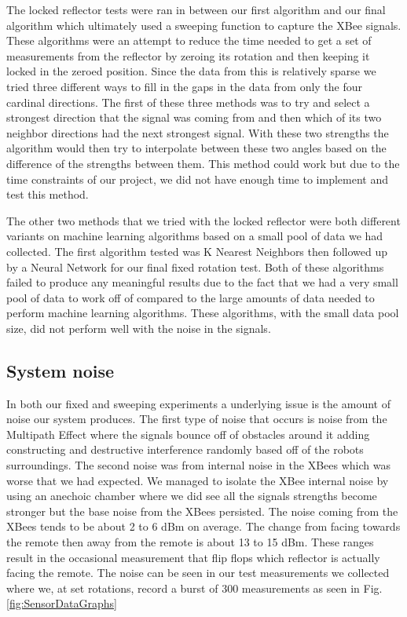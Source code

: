 The locked reflector tests were ran in between our first algorithm and our final algorithm which ultimately used a sweeping function to capture the XBee signals. These algorithms were an attempt to reduce the time needed to get a set of measurements from the reflector by zeroing its rotation and then keeping it locked in the zeroed position. Since the data from this is relatively sparse we tried three different ways to fill in the gaps in the data from only the four cardinal directions. The first of these three methods was to try and select a strongest direction that the signal was coming from and then which of its two neighbor directions had the next strongest signal. With these two strengths the algorithm would then try to interpolate between these two angles based on the difference of the strengths between them. This method could work but due to the time constraints of our project, we did not have enough time to implement and test this method.

\vspace*{12pt}
\noindent
The other two methods that we tried with the locked reflector were both different variants on machine learning algorithms based on a small pool of data we had collected. The first algorithm tested was K Nearest Neighbors then followed up by a Neural Network for our final fixed rotation test. Both of these algorithms failed to produce any meaningful results due to the fact that we had a very small pool of data to work off of compared to the large amounts of data needed to perform machine learning algorithms. These algorithms, with the small data pool size, did not perform well with the noise in the signals.

\subsection{System noise}

In both our fixed and sweeping experiments a underlying issue is the amount of noise our system produces. The first type of noise that occurs is noise from the Multipath Effect where the signals bounce off of obstacles around it adding constructing and destructive interference randomly based off of the robots surroundings. The second noise was from internal noise in the XBees which was worse that we had expected. We managed to isolate the XBee internal noise by using an anechoic chamber where we did see all the signals strengths become stronger but the base noise from the XBees persisted. The noise coming from the XBees tends to be about 2 to 6 dBm on average. The change from facing towards the remote then away from the remote is about 13 to 15 dBm. These ranges result in the occasional measurement that flip flops which reflector is actually facing the remote. The noise can be seen in our test measurements we collected where we, at set rotations, record a burst of 300 measurements as seen in Fig. \ref{fig:SensorDataGraphs}

